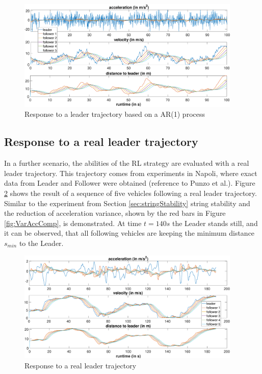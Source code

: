 \documentclass[review]{elsarticle}
\begin{document}
\begin{figure}
	\centering
	\includegraphics[width=0.95\textwidth]{images/AR1Kolonne}
	\caption{Response to a leader trajectory based on a AR(1) process}
	\label{fig:AR1Kolonne}
\end{figure}


\subsection{Response to a real leader trajectory}

In a further scenario, the abilities of the RL strategy are evaluated with a real leader trajectory. This trajectory comes from experiments in Napoli, where exact data from Leader and Follower were obtained (reference to Punzo et al.). Figure \ref{fig:PunzoKolonne} shows the result of a sequence of five vehicles following a real leader trajectory. Similar to the experiment from Section \ref{sec:stringStability} string stability and the reduction of acceleration variance, shown by the red bars in Figure \ref{fig:VarAccComp}, is demonstrated. At time $t = 140s$ the Leader stands still, and it can be observed, that all following vehicles are keeping the minimum distance $s_{min}$ to the Leader. 


\begin{figure}
	\centering
	\includegraphics[width=0.95\textwidth]{images/PunzoKolonne}
	\caption{Response to a real leader trajectory}
	\label{fig:PunzoKolonne}
\end{figure}
\end{document}

